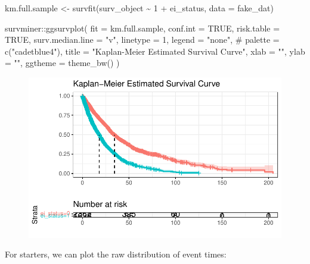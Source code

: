 \documentclass[
  letterpaper,
  DIV=11,
  numbers=noendperiod]{scrreprt}
\newenvironment{Shaded}{\begin{snugshade}}{\end{snugshade}}
\newcommand{\AttributeTok}[1]{\textcolor[rgb]{0.40,0.45,0.13}{#1}}
\newcommand{\CommentTok}[1]{\textcolor[rgb]{0.37,0.37,0.37}{#1}}
\newcommand{\ConstantTok}[1]{\textcolor[rgb]{0.56,0.35,0.01}{#1}}
\newcommand{\DecValTok}[1]{\textcolor[rgb]{0.68,0.00,0.00}{#1}}
\newcommand{\FunctionTok}[1]{\textcolor[rgb]{0.28,0.35,0.67}{#1}}
\newcommand{\NormalTok}[1]{\textcolor[rgb]{0.00,0.23,0.31}{#1}}
\newcommand{\OtherTok}[1]{\textcolor[rgb]{0.00,0.23,0.31}{#1}}
\newcommand{\SpecialCharTok}[1]{\textcolor[rgb]{0.37,0.37,0.37}{#1}}
\newcommand{\StringTok}[1]{\textcolor[rgb]{0.13,0.47,0.30}{#1}}
\begin{document}
\begin{Shaded}
\begin{Highlighting}[]
\NormalTok{km.full.sample }\OtherTok{\textless{}{-}} \FunctionTok{survfit}\NormalTok{(surv\_object }\SpecialCharTok{\textasciitilde{}} \DecValTok{1} \SpecialCharTok{+}\NormalTok{ ei\_status, }\AttributeTok{data =}\NormalTok{ fake\_dat)}

\NormalTok{survminer}\SpecialCharTok{::}\FunctionTok{ggsurvplot}\NormalTok{(}
  \AttributeTok{fit =}\NormalTok{ km.full.sample,}
  \AttributeTok{conf.int =} \ConstantTok{TRUE}\NormalTok{,}
  \AttributeTok{risk.table =} \ConstantTok{TRUE}\NormalTok{,}
  \AttributeTok{surv.median.line =} \StringTok{"v"}\NormalTok{,}
  \AttributeTok{linetype =} \DecValTok{1}\NormalTok{,}
  \AttributeTok{legend =} \StringTok{"none"}\NormalTok{,}
  \CommentTok{\#  palette = c("cadetblue4"),}
  \AttributeTok{title =} \StringTok{"Kaplan{-}Meier Estimated Survival Curve"}\NormalTok{,}
  \AttributeTok{xlab =} \StringTok{""}\NormalTok{, }
  \AttributeTok{ylab =} \StringTok{""}\NormalTok{,}
  \AttributeTok{ggtheme =} \FunctionTok{theme\_bw}\NormalTok{()}
\NormalTok{) }
\end{Highlighting}
\end{Shaded}

\begin{figure}[H]

{\centering \includegraphics{./bayesian-cfa_files/figure-pdf/unnamed-chunk-21-1.pdf}

}

\end{figure}

For starters, we can plot the raw distribution of event times:
\end{document}
